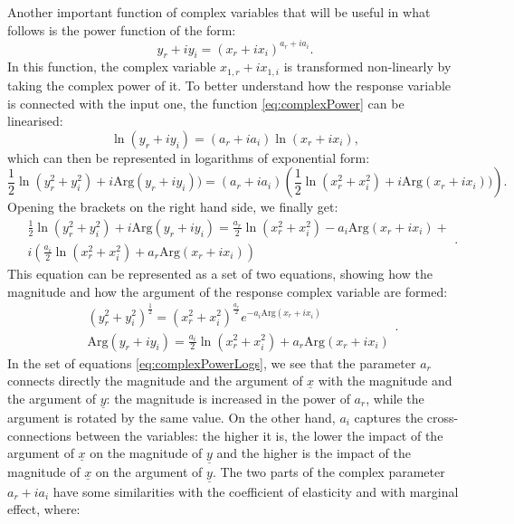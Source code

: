 \documentclass[
]{book}
\begin{document}
Another important function of complex variables that will be useful in what follows is the power function of the form:
\begin{equation}
    y_r + i y_i = (x_{r} + i x_{i}) ^{a_{r} + i a_{i}} .
    \label{eq:complexPower}
\end{equation}
In this function, the complex variable \(x_{1,r} + i x_{1,i}\) is transformed non-linearly by taking the complex power of it. To better understand how the response variable is connected with the input one, the function \eqref{eq:complexPower} can be linearised:
\begin{equation*}
    \ln (y_r + i y_i) = (a_{r} + i a_{i}) \ln (x_{r} + i x_{i}) ,
\end{equation*}
which can then be represented in logarithms of exponential form:
\begin{equation*}
    \frac{1}{2} \ln \left({y_r^2 + y_i^2}\right) + {i \mathrm{Arg}(y_r + i y_i)}) = (a_{r} + i a_{i}) \left(\frac{1}{2} \ln \left({x_r^2 + x_i^2}\right) + {i \mathrm{Arg}(x_r + i x_i)})\right) .
\end{equation*}
Opening the brackets on the right hand side, we finally get:
\begin{equation*}
    \begin{aligned}
    & \frac{1}{2} \ln \left({y_r^2 + y_i^2}\right) + {i \mathrm{Arg}(y_r + i y_i)} = \frac{a_{r}}{2} \ln \left({x_r^2 + x_i^2}\right) - a_{i} \mathrm{Arg}(x_r + i x_i) + \\
    & i \left(\frac{a_{i}}{2} \ln \left({x_r^2 + x_i^2}\right) + a_r \mathrm{Arg}(x_r + i x_i)  \right) 
    \end{aligned} .
\end{equation*}
This equation can be represented as a set of two equations, showing how the magnitude and how the argument of the response complex variable are formed:
\begin{equation}
    \begin{aligned}
        & \left({y_r^2 + y_i^2}\right)^{\frac{1}{2}} = \left({x_r^2 + x_i^2}\right)^{\frac{a_{r}}{2}} e^{- a_{i} \mathrm{Arg}(x_r + i x_i)} \\
        & \mathrm{Arg}(y_r + i y_i) = \frac{a_{i}}{2} \ln \left({x_r^2 + x_i^2}\right) + a_r \mathrm{Arg}(x_r + i x_i)
    \end{aligned} .
    \label{eq:complexPowerLogs}
\end{equation}
In the set of equations \eqref{eq:complexPowerLogs}, we see that the parameter \(a_r\) connects directly the magnitude and the argument of \(\underline{x}\) with the magnitude and the argument of \(\underline{y}\): the magnitude is increased in the power of \(a_r\), while the argument is rotated by the same value. On the other hand, \(a_i\) captures the cross-connections between the variables: the higher it is, the lower the impact of the argument of \(\underline{x}\) on the magnitude of \(\underline{y}\) and the higher is the impact of the magnitude of \(\underline{x}\) on the argument of \(\underline{y}\). The two parts of the complex parameter \(a_r + i a_i\) have some similarities with the coefficient of elasticity and with marginal effect, where:
\end{document}
